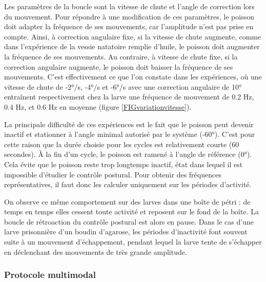 Les paramètres de la boucle sont la vitesse de chute et l'angle de correction lors du mouvement. Pour répondre à une modification de ces paramètres, le poisson doit adapter la fréquence de ses mouvements, car l'amplitude n'est pas prise en compte. Ainsi, à correction angulaire fixe, si la vitesse de chute augmente, comme dans l'expérience de la vessie natatoire remplie d'huile, le poisson doit augmenter la fréquence de ses mouvements. Au contraire, à vitesse de chute fixe, si la correction angulaire augmente, le poisson doit baisser la fréquence de ses mouvements. C'est effectivement ce que l'on constate dans les expériences, où une vitesse de chute de -2°/s, -4°/s et -6°/s avec une correction angulaire de 10° entraînent respectivement chez la larve une fréquence de mouvement de 0.2 Hz, 0.4 Hz, et 0.6 Hz en moyenne (figure \ref{FIGvariationvitesse}).


La principale difficulté de ces expériences est le fait que le poisson peut devenir inactif et stationner à l'angle minimal autorisé par le système (-60°). C'est pour cette raison que la durée choisie pour les cycles est relativement courte (60 secondes). À la fin d'un cycle, le poisson est ramené à l'angle de référence (0°). Cela évite que le poisson reste trop longtemps inactif, état dans lequel il est impossible d'étudier le contrôle postural. Pour obtenir des fréquences représentatives, il faut donc les calculer uniquement sur les périodes d'activité.

On observe ce même comportement sur des larves dans une boîte de pétri : de temps en temps elles cessent toute activité et reposent sur le fond de la boîte. La boucle de rétroaction du contrôle postural est alors en pause. Dans le cas d'une larve prisonnière d'un boudin d'agarose, les périodes d'inactivité font souvent suite à un mouvement d'échappement, pendant lequel la larve tente de s'échapper en déclenchant des mouvements de très grande amplitude.

\subsubsection{Protocole multimodal}

